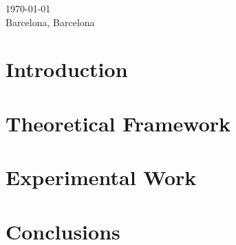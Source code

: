 \documentclass[a4paper,12pt,arial,numbered,print,index,oneside]{book}
\newcommand\blankpage{%
	\null
	\thispagestyle{empty}%
	\addtocounter{page}{-1}%
	\newpage}
\let\LaTeXStandardTableOfContents\tableofcontents
\renewcommand{\tableofcontents}{%
	\begingroup%
	\renewcommand{\bfseries}{\relax}%
	\LaTeXStandardTableOfContents%
	\endgroup%
}%
\begin{document}
\begin{titlepage}
		
		\vspace{.5cm}
		
		
		{\large \today} \\
		\large Barcelona, Barcelona  
		
		
		\vfill %
		
	\end{titlepage}

	
	\onehalfspacing
	\setlength{\parskip}{0.5cm plus4mm minus3mm}
	\afterpage{\blankpage}
	
	\tableofcontents
	
	\clearpage
	
	\thispagestyle{plain}
	
	\chapter{Introduction}
	\label{chap:intro}
	
	
	\chapter{Theoretical Framework}
	\label{chap:theoretical_framework}
	
	
	\chapter{Experimental Work}
	\label{chap:experimental_work}
	

	
	\chapter{Conclusions}
	\label{chap:conclusions}
	
	
	\printglossaries
	
	
	\begin{appendices}
		
	\end{appendices}

	
	
	
\end{document}
